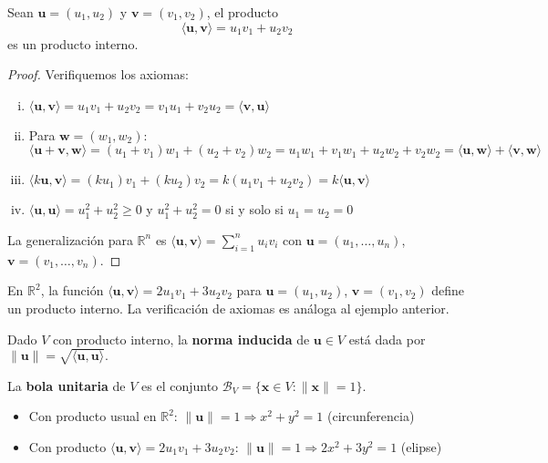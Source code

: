 \begin{example}
Sean $\mathbf{u} = (u_1, u_2)$ y $\mathbf{v} = (v_1, v_2)$, el producto $$\langle \mathbf{u}, \mathbf{v} \rangle = u_1v_1 + u_2v_2$$ es un producto interno.
\begin{proof}
Verifiquemos los axiomas:
\begin{enumerate}[i.]
    \item $\langle \mathbf{u}, \mathbf{v} \rangle = u_1v_1 + u_2v_2 = v_1u_1 + v_2u_2 = \langle \mathbf{v}, \mathbf{u} \rangle$
    \item Para $\mathbf{w} = (w_1, w_2)$: \\
    $\langle \mathbf{u} + \mathbf{v}, \mathbf{w} \rangle = (u_1 + v_1)w_1 + (u_2 + v_2)w_2 = u_1w_1 + v_1w_1 + u_2w_2 + v_2w_2 = \langle \mathbf{u}, \mathbf{w} \rangle + \langle \mathbf{v}, \mathbf{w} \rangle$
    \item $\langle k\mathbf{u}, \mathbf{v} \rangle = (ku_1)v_1 + (ku_2)v_2 = k(u_1v_1 + u_2v_2) = k\langle \mathbf{u}, \mathbf{v} \rangle$
    \item $\langle \mathbf{u}, \mathbf{u} \rangle = u_1^2 + u_2^2 \geq 0$ y $u_1^2 + u_2^2 = 0$ si y solo si $u_1 = u_2 = 0$
\end{enumerate}
La generalización para $\mathbb{R}^n$ es $\langle \mathbf{u}, \mathbf{v} \rangle = \sum_{i=1}^n u_i v_i$ con $\mathbf{u} = (u_1, \dots, u_n)$, $\mathbf{v} = (v_1, \dots, v_n)$.
\end{proof}
\end{example}

\begin{example}
En $\mathbb{R}^2$, la función $\langle \mathbf{u}, \mathbf{v} \rangle = 2u_1v_1 + 3u_2v_2$ para $\mathbf{u} = (u_1, u_2)$, $\mathbf{v} = (v_1, v_2)$ define un producto interno. La verificación de axiomas es análoga al ejemplo anterior.
\end{example}

\begin{definition}
Dado $V$ con producto interno, la \textbf{norma inducida} de $\mathbf{u} \in V$ está dada por \(\|\mathbf{u}\| = \sqrt{\langle \mathbf{u}, \mathbf{u} \rangle}
.\)
\end{definition}

\begin{definition}
La \textbf{bola unitaria} de $V$ es el conjunto \(
\mathcal{B}_V = \{ \mathbf{x} \in V : \|\mathbf{x}\| = 1 \}.\)
\begin{itemize}
    \item Con producto usual en $\mathbb{R}^2$: $\|\mathbf{u}\| = 1 \Rightarrow x^2 + y^2 = 1$ (circunferencia)
    \item Con producto $\langle \mathbf{u}, \mathbf{v} \rangle = 2u_1v_1 + 3u_2v_2$: $\|\mathbf{u}\| = 1 \Rightarrow 2x^2 + 3y^2 = 1$ (elipse)
\end{itemize}
\end{definition}

